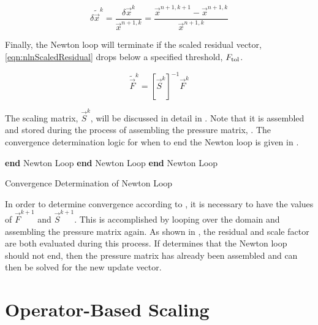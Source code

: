 \begin{equation}
\label{eqn:nlnUpdateVector}
\delta \tilde{\vec{x}}^{k} = \frac{\delta \vec{x}^{k}}{\vec{x}^{n+1, k}} = \frac{ \vec{x}^{n+1, k+1} - \vec{x}^{n+1, k}}{\vec{x}^{n+1,k}}
\end{equation}

Finally, the Newton loop will terminate if the scaled residual vector, \eqref{eqn:nlnScaledResidual} drops below a specified threshold, $\ftol{}$.

\begin{equation}
\label{eqn:nlnScaledResidual}
\tilde{\vec{F}}^{k} = \left[\vec{S}^{k}\right]^{-1}\vec{F}^{k}
\end{equation}

The scaling matrix, $\vec{S}^{k}$, will be discussed in detail in .
Note that it is assembled and stored during the process of assembling the pressure matrix, .
The convergence determination logic for when to end the Newton loop is given in .

\begin{algo}[ht!]
\setlength{\baselineskip}{0.625\baselineskip}
\begin{algorithmic}[1]
	\State \textbf{end} Newton Loop
	\State \textbf{end} Newton Loop
	\State \textbf{end} Newton Loop
\EndIf
\end{algorithmic}
\caption{Convergence Determination of Newton Loop}
\label{alg:nlnConvergence}
\end{algo}

In order to determine convergence according to , it is necessary to have the values of $\vec{F}^{k+1}$ and $\vec{S}^{k+1}$.
This is accomplished by looping over the domain and assembling the pressure matrix again.
As shown in , the residual and scale factor are both evaluated during this process.
If  determines that the Newton loop should not end, then the pressure matrix has already been  assembled and can then be solved for the new update vector.

\section{Operator-Based Scaling}
\label{sect:nlnScaling}

